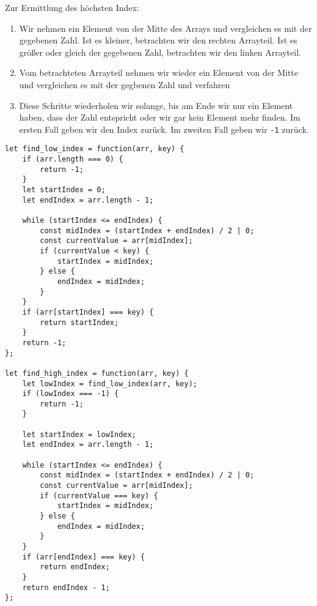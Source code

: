 \documentclass{book}
\begin{document}
Zur Ermittlung des höchsten Index:
\begin{enumerate}
	\item Wir nehmen ein Element von der Mitte des Arrays und vergleichen es mit der gegebenen Zahl. Ist es kleiner, betrachten wir den rechten Arrayteil. Ist es größer oder gleich der gegebenen Zahl, betrachten wir den linken Arrayteil.
	\item Vom betrachteten Arrayteil nehmen wir wieder ein Element von der Mitte und vergleichen es mit der gegbenen Zahl und verfahren 
	\item Diese Schritte wiederholen wir solange, bis am Ende wir nur ein Element haben, dass der Zahl entspricht oder wir gar kein Element mehr finden. Im ersten Fall geben wir den Index zurück. Im zweiten Fall geben wir \lstinline|-1| zurück.
\end{enumerate}

\begin{lstlisting}[caption=My Javascript Example]
let find_low_index = function(arr, key) {
	if (arr.length === 0) {
		return -1;
	}
	let startIndex = 0;
	let endIndex = arr.length - 1;

	while (startIndex <= endIndex) {
		const midIndex = (startIndex + endIndex) / 2 | 0;
		const currentValue = arr[midIndex];
		if (currentValue < key) {
			startIndex = midIndex;
		} else {
			endIndex = midIndex;
		}
	}
	if (arr[startIndex] === key) {
		return startIndex;
	}
	return -1;
};

let find_high_index = function(arr, key) {
	let lowIndex = find_low_index(arr, key);
	if (lowIndex === -1) {
		return -1;
	}

	let startIndex = lowIndex;
	let endIndex = arr.length - 1;
	
	while (startIndex <= endIndex) {
		const midIndex = (startIndex + endIndex) / 2 | 0;
		const currentValue = arr[midIndex];
		if (currentValue === key) {
			startIndex = midIndex;
		} else {
			endIndex = midIndex;
		}
	}
	if (arr[endIndex] === key) {
		return endIndex;
	}
	return endIndex - 1;
};
\end{lstlisting}
\end{document}
